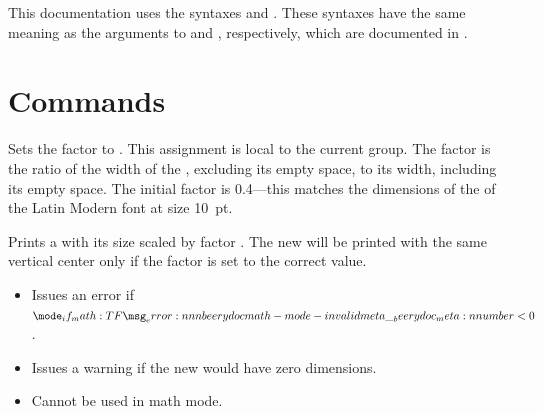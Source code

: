\documentclass{beerydoc}
\begin{document}
This documentation uses the syntaxes  and .
These syntaxes have the same meaning as the arguments to  and
, respectively, which are documented in .


\section{Commands}
\label{sec:commands}

\begin{code}{\settextbulletfactor}
  \begin{syntax}
     
  \end{syntax}
  Sets the  factor to .
  This assignment is local to the current group.
  The  factor is the ratio of the width of the ,
  excluding its empty space, to its width, including its empty space.
  The initial  factor is \num{0.4}---this matches the
  dimensions of the  of the Latin Modern font at size
  \qty{10}{pt}.
\end{code}

\begin{code}{\scaletextbullet}
  \begin{syntax}
     
  \end{syntax}
  Prints a  with its size scaled by factor .
  The new  will be printed with the same vertical center only if
  the  factor is set to the correct value.

  \begin{itemize}
    \item
    Issues an error if $\meta{number}<\num{0}$.
    \item
    Issues a warning if the new  would have zero dimensions.
    \item
    Cannot be used in math mode.
  \end{itemize}
\end{code}
\end{document}
